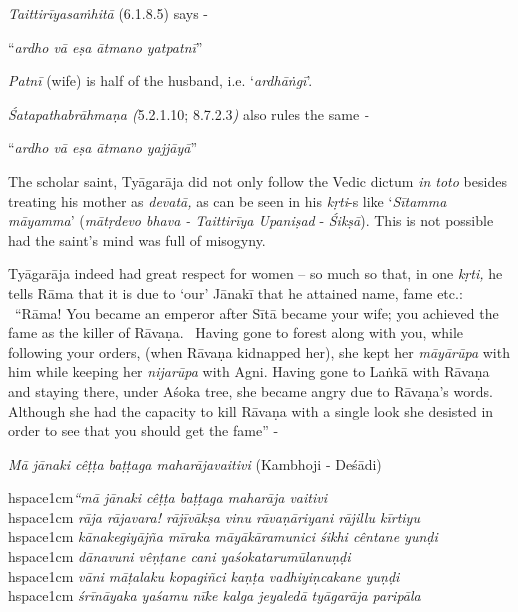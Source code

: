\textit{Taittirīyasaṁhitā} (6.1.8.5) says -

\begin{centerquote}
“\textit{ardho vā eṣa ātmano yatpatnī}”
\end{centerquote}

\textit{Patnī} (wife) is half of the husband, i.e. ‘\textit{ardhāṅgī}’.

\textit{Śatapathabrāhmaṇa (}5.2.1.10; 8.7.2.3\textit{)} also rules the same \textit{-}

\begin{centerquote}
“\textit{ardho vā eṣa ātmano yajjāyā}”
\end{centerquote}

The scholar saint, Tyāgarāja did not only follow the Vedic dictum \textit{in toto} besides treating his mother as \textit{devatā,} as can be seen in his \textit{kṛti}-s like ‘\textit{Sītamma māyamma}’ (\textit{mātṛdevo bhava - Taittirīya Upaniṣad} - \textit{Śikṣā}). This is not possible had the saint’s mind was full of misogyny.

Tyāgarāja indeed had great respect for women – so much so that, in one \textit{kṛti,} he tells Rāma that it is due to ‘our’ Jānakī that he attained name, fame etc.:  “Rāma! You became an emperor after Sītā became your wife; you achieved the fame as the killer of Rāvaṇa.  Having gone to forest along with you, while following your orders, (when Rāvaṇa kidnapped her), she kept her \textit{māyārūpa} with him while keeping her \textit{nijarūpa} with Agni. Having gone to Laṅkā with Rāvaṇa and staying there, under Aśoka tree, she became angry due to Rāvaṇa’s words. Although she had the capacity to kill Rāvaṇa with a single look she desisted in order to see that you should get the fame” -  

\textit{Mā jānaki cêṭṭa baṭṭaga maharājavaitivi} (Kambhoji - Deśādi)

\begin{myquote}
hspace{1cm}\textit{“mā jānaki cêṭṭa baṭṭaga maharāja vaitivi}\\hspace{1cm} \textit{rāja rājavara! rājīvākṣa vinu rāvaṇāriyani rājillu kīrtiyu}\\hspace{1cm} \textit{kānakegiyājña mīraka māyākāramunici śikhi cêntane yunḍi}\\hspace{1cm} \textit{dānavuni vêṇṭane cani yaśokatarumūlanuṇḍi}\\hspace{1cm} \textit{vāni māṭalaku kopagiñci kaṇṭa vadhiyiṇcakane yuṇḍi} \\hspace{1cm} \textit{śrīnāyaka yaśamu nīke kalga jeyaledā tyāgarāja paripāla}
\end{myquote}

